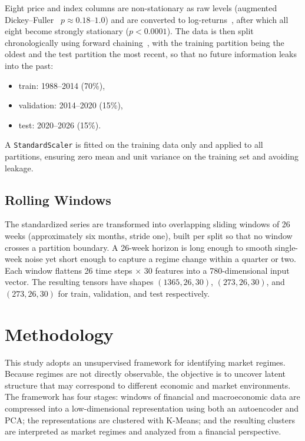 \documentclass[conference]{IEEEtran}
\begin{document}
Eight price and index columns are non-stationary as raw levels (augmented
Dickey--Fuller~\cite{dickey1979distribution} $p \approx 0.18$--$1.0$) and are converted to log-returns~\cite{campbell1997econometrics}, after
which all eight become strongly stationary ($p < 0.0001$). The data is then
split chronologically using forward chaining~\cite{lopez2018advances}, with the training partition being
the oldest and the test partition the most recent, so that no future information
leaks into the past:
\begin{itemize}
  \item train: 1988--2014 (70\%),
  \item validation: 2014--2020 (15\%),
  \item test: 2020--2026 (15\%).
\end{itemize}
A \texttt{StandardScaler} is fitted on the training data only and applied to all
partitions, ensuring zero mean and unit variance on the training set and
avoiding leakage.

\subsection{Rolling Windows}

The standardized series are transformed into overlapping sliding windows of 26
weeks (approximately six months, stride one), built per split so that no window
crosses a partition boundary. A 26-week horizon is long enough to smooth
single-week noise yet short enough to capture a regime change within a quarter
or two. Each window flattens 26 time steps $\times$ 30 features into a
780-dimensional input vector. The resulting tensors have shapes
$(1365, 26, 30)$, $(273, 26, 30)$, and $(273, 26, 30)$ for train, validation,
and test respectively.

\section{Methodology}

This study adopts an unsupervised framework for identifying market regimes.
Because regimes are not directly observable, the objective is to uncover latent
structure that may correspond to different economic and market environments. The
framework has four stages: windows of financial and macroeconomic data are
compressed into a low-dimensional representation using both an autoencoder and
PCA; the representations are clustered with K-Means; and the resulting clusters
are interpreted as market regimes and analyzed from a financial perspective.
\end{document}
